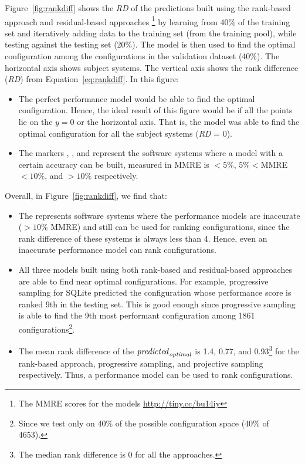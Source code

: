 Figure~\ref{fig:rankdiff} shows the \textit{RD} of the predictions built using the rank-based approach and residual-based approaches \footnote{The MMRE scores for the models \url{http://tiny.cc/bu14iy}} by learning from 40\% of the training set and iteratively adding data to the training set (from the training pool), while testing against the testing set (20\%). The model is then used to find the optimal configuration among the configurations in the validation dataset (40\%). The horizontal axis shows subject systems. The vertical axis shows the rank difference (\textit{RD}) from Equation~\ref{eq:rankdiff}. In this figure:
\begin{itemize}
    \item The perfect performance model would be able to find the optimal configuration. Hence, the ideal result of this figure would be if all the points lie on the $y=0$ or the horizontal axis. That is, the model was able to find the optimal configuration for all the subject systems (\textit{RD} = 0). 
    \item The markers \protect\custriangle{}, \protect\cusdot{}, and \protect\cuscross{} represent the software systems where  a  model with a certain accuracy can be built, measured in MMRE is  $<5\%$, $5\%<$MMRE$<10\%$, and $>10\%$ respectively.
\end{itemize}



Overall, in Figure~\ref{fig:rankdiff}, we find that:
\begin{itemize}
    \item The \cuscross{} represents software systems where the performance models are inaccurate ($>10\%$ MMRE) and still can be used for ranking configurations, since the rank difference of these systems is always less than 4. Hence, even an inaccurate performance model can rank configurations.
    \item All three models built using both rank-based and residual-based approaches are able to find near optimal configurations. For example, progressive sampling for SQLite predicted the configuration whose performance score is ranked 9th in the testing set. This is good enough since progressive sampling is able to find the 9th most performant configuration among 1861 configurations\footnote{Since we test only on 40\% of the possible configuration space (40\% of 4653).}.
    \item The mean rank difference of the $\mathit{predicted}_{\mathit{\small{optimal}}}$ is 1.4, 0.77, and 0.93\footnote{The median rank difference is 0 for all the approaches.} for the rank-based approach, progressive sampling, and projective sampling respectively. Thus, a performance model can be used to rank configurations.
\end{itemize}


